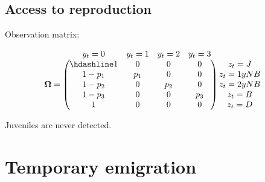 \documentclass[
  12pt,
]{krantz}
\begin{document}
\hypertarget{access-to-reproduction-1}{%
\subsection{Access to reproduction}\label{access-to-reproduction-1}}

Observation matrix:

\[
\begin{matrix}
& \\
\mathbf{\Omega} =
    \left ( \vphantom{ \begin{matrix} 12 \\ 12 \\ 12 \\ 12 \\12 \end{matrix} } \right .
\end{matrix}
\hspace{-1.2em}
\begin{matrix}
y_t = 0 & y_t = 1 & y_t = 2 & y_t = 3\\ \hdashline
1 & 0 & 0 & 0\\
1 - p_1 & p_1 & 0 & 0\\
1 - p_2 & 0 & p_2 & 0\\
1 - p_3 & 0 & 0 & p_3\\
1 & 0 & 0 & 0
\end{matrix}
\hspace{-0.2em}
\begin{matrix}
& \\
\left . \vphantom{ \begin{matrix} 12 \\ 12 \\ 12 \\ 12 \\12 \end{matrix} } \right )
    \begin{matrix}
    z_t = J \\ z_t = 1yNB \\ z_t = 2yNB \\ z_t = B \\ z_t = D
    \end{matrix}
\end{matrix}
\]

Juveniles are never detected.

\hypertarget{temporary-emigration}{%
\section{Temporary emigration}\label{temporary-emigration}}
\end{document}
